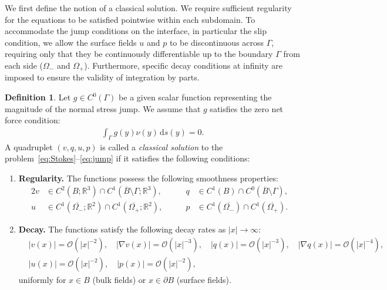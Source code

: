 \documentclass{article}
\theoremstyle{remark}
\theoremstyle{definition}
\newtheorem{definition}[theorem]{Definition}
\numberwithin{equation}{section}
\begin{document}
We first define the notion of a classical solution. We require sufficient regularity for the equations to be satisfied pointwise within each subdomain. To accommodate the jump conditions on the interface, in particular the slip condition, we allow the surface fields $u$ and $p$ to be discontinuous across $\Gamma$, requiring only that they be continuously differentiable up to the boundary $\Gamma$ from each side ($\Omega_-$ and $\Omega_+$). Furthermore, specific decay conditions at infinity are imposed to ensure the validity of integration by parts.

\begin{definition}
    \label{def:classical}
    Let $g \in C^0(\Gamma)$ be a given scalar function representing the magnitude of the normal stress jump. We assume that $g$ satisfies the zero net force condition:
    \begin{align*}
        \int_\Gamma g(y)\nu(y) \,\mathrm{d}s(y) = 0.
    \end{align*}
    A quadruplet $(v,q,u,p)$ is called a \textit{classical solution} to the problem~\eqref{eq:Stokes}--\eqref{eq:jump} if it satisfies the following conditions:
    \begin{enumerate}
        \item \textbf{Regularity.} The functions possess the following smoothness properties:
        \begin{alignat*}{2}
            v &\in C^2(B;\mathbb{R}^3) \cap C^1(\overline{B}\setminus\Gamma; \mathbb{R}^3), &\qquad
            q &\in C^1(B)\cap C^0(\overline{B}\setminus\Gamma), \\
            u &\in C^1(\overline{\Omega_-};\mathbb{R}^2) \cap C^1(\overline{\Omega_+};\mathbb{R}^2), &\qquad
            p &\in C^1(\overline{\Omega_-}) \cap C^1(\overline{\Omega_+}).
        \end{alignat*}
        
        \item \textbf{Decay.} The functions satisfy the following decay rates as $|x|\to\infty$:
        \begin{align*}
            &|v(x)|=\mathcal{O}(|x|^{-2}),\quad
            |\nabla v(x)|=\mathcal{O}(|x|^{-3}),\quad
            |q(x)|=\mathcal{O}(|x|^{-3}),\quad
            |\nabla q(x)|=\mathcal{O}(|x|^{-4}),\\
            &|u(x)|=\mathcal{O}(|x|^{-2}),\quad
            |p(x)|=\mathcal{O}(|x|^{-2}),
        \end{align*}
        uniformly for $x\in B$ (bulk fields) or $x\in \partial B$ (surface fields).
        

\end{enumerate}
\end{definition}
\end{document}
